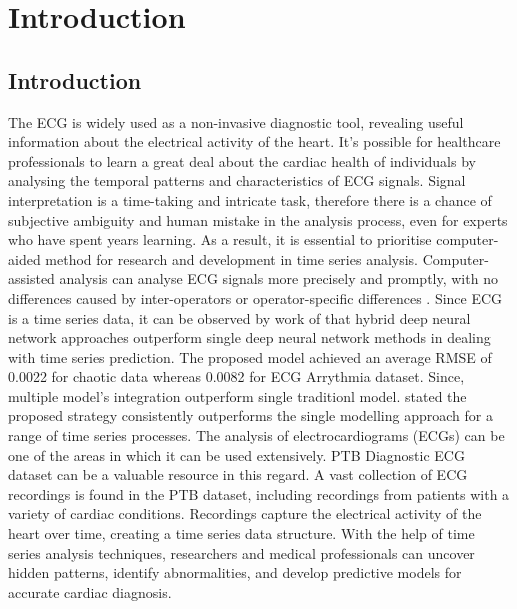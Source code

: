 
\chapter{Introduction} %

\label{c1} %


\section{Introduction}
The ECG is widely used as a non-invasive diagnostic tool,  revealing useful information about the electrical activity of the heart. It's possible for healthcare professionals to learn a great deal about the cardiac health of individuals by analysing the temporal patterns and characteristics of ECG signals. Signal interpretation is a time-taking and intricate task,  therefore there is a chance of subjective ambiguity and human mistake in the analysis process,  even for experts who have spent years learning. As a result,  it is essential to prioritise computer-aided method for research  and development in time series analysis.  Computer-assisted analysis can analyse ECG signals more precisely and promptly,  with no differences caused by inter-operators or operator-specific differences \cite{liu2021deep}. Since ECG is a time series data,  it can be observed by work of \cite{dudukcu2023temporal} that hybrid deep neural network approaches outperform single deep neural network methods in dealing with time series prediction. The proposed model achieved an average RMSE of 0.0022 for chaotic data whereas 0.0082 for ECG Arrythmia dataset. Since, multiple model's integration outperform single traditionl model.   \cite{zhang2007neural} stated the proposed strategy consistently outperforms the single modelling approach for a range of time series processes. The analysis of electrocardiograms (ECGs) can be one of the areas in which it can be used extensively. PTB Diagnostic ECG dataset can be a valuable resource in this regard. A vast collection of ECG recordings is found in the PTB dataset,  including recordings from patients with a variety of cardiac conditions. Recordings capture the electrical activity of the heart over time,  creating a time series data structure. With the help of time series analysis techniques,  researchers and medical professionals can uncover hidden patterns,  identify abnormalities,  and develop predictive models for accurate cardiac diagnosis.
